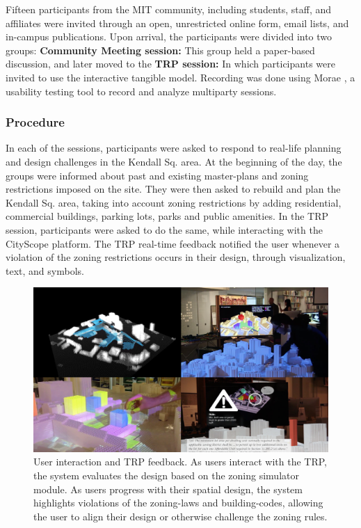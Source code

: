 {{        Fifteen participants from the MIT community, including students, staff, and affiliates were invited through an open, unrestricted online form, email lists, and in-campus publications. Upon arrival, the participants were divided into two groups: \textbf{Community Meeting session:} This group held a paper-based discussion, and later moved to the \textbf{TRP session:} In which participants were invited to use the interactive tangible model.  Recording was done using Morae \cite{techsmit94:online}, a usability testing tool to record and analyze multiparty sessions.


        \subsubsection{Procedure}
        {
            In each of the sessions, participants were asked to respond to real-life planning and design challenges in the Kendall Sq. area. At the beginning of the day, the groups were informed about past and existing master-plans and zoning restrictions imposed on the site. They were then asked to rebuild and plan the Kendall Sq. area, taking into account zoning restrictions by adding residential, commercial buildings, parking lots, parks and public amenities. In the TRP session, participants were asked to do the same, while interacting with the CityScope platform. The TRP real-time feedback notified the user whenever a violation of the zoning restrictions occurs in their design, through visualization, text, and symbols.
        }




        \begin{figure}[!htb]
            \begin{center}
                \includegraphics[width=1\textwidth]{chapters/transformation/playground/figures/playground3.png}
            \end{center}
            \caption{User interaction and TRP feedback. As users interact with the TRP, the system evaluates the design based on the zoning simulator module. As users progress with their spatial design, the system highlights violations of the zoning-laws and building-codes, allowing the user to align their design or otherwise challenge the zoning rules.}
            \label{fig:pg_interaction}
        \end{figure}


}}
